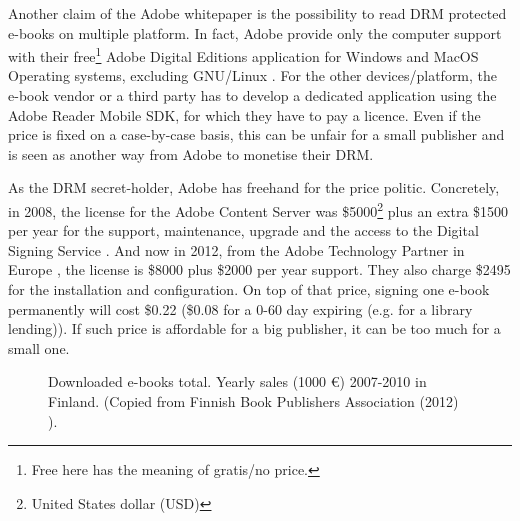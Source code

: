 \documentclass[11pt,a4paper,oneside]{memoir}
\begin{document}
Another claim of the Adobe whitepaper \cite[Device interoperability section]{adobe:whitepaper} is the possibility to read DRM protected e-books on multiple platform. In fact, Adobe provide only the computer support with their free\footnote{Free here has the meaning of gratis/no price.} Adobe Digital Editions application for Windows and MacOS Operating systems, excluding GNU/Linux \cite{adobe:ade_linux}. For the other devices/platform, the e-book vendor or a third party has to develop a dedicated application using the Adobe Reader Mobile SDK, for which they have to pay a licence. Even if the price is fixed on a case-by-case basis, this can be unfair for a small publisher and is seen as another way from Adobe to monetise their DRM.

As the DRM secret-holder, Adobe has freehand for the price politic. 
Concretely, in 2008, the license for the Adobe Content Server was \$5000\footnote{United States dollar (USD)} plus an extra \$1500 per year for the support, maintenance, upgrade and the access to the Digital Signing Service \cite{adobe:content_server_price}. 
And now in 2012, from the Adobe Technology Partner in Europe \cite{ctrlpublishing:content_server_price}, 
the license is \$8000 plus \$2000 per year support. 
They also charge \$2495 for the installation and configuration. 
On top of that price, signing one e-book permanently will cost \$0.22 (\$0.08 for a 0-60 day expiring (e.g. for a library lending)). 
If such price is affordable for a big publisher, it can be too much for a small one.
\begin{figure}[h]
   \setlength{\fboxsep}{3pt}
   \caption{Downloaded e-books total. Yearly sales (1000 \euro) 2007-2010 in Finland. 
   (Copied from Finnish Book Publishers Association (2012) \cite{kustantajat:year_sale_ebook}).}
   \label{fig:def:e-book-sale-fi}
\end{figure}
\end{document}
